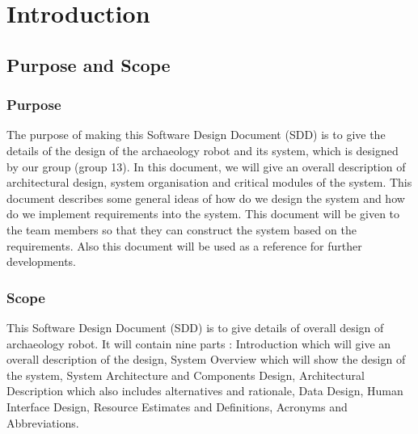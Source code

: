 \documentclass[11pt, a4paper]{report}
\begin{document}

\chapter{Introduction}%
\label{cha:I}


\section{Purpose and Scope}
\subsection{Purpose}
The purpose of making this Software Design Document (SDD) is to give the details of the design of the archaeology robot and its system, which is designed by our group (group 13). In this document, we will give an overall description of architectural design, system organisation and critical modules of the system. This document describes some general ideas of how do we design the system and how do we implement requirements into the system. This document will be given to the team members so that they can construct the system based on the requirements. Also this document will be used as a reference for further developments.


\subsection{Scope}
This Software Design Document (SDD) is to give details  of overall design of archaeology robot. It will contain nine parts : Introduction which will give an overall description of the design, System Overview which will show the design of the system, System Architecture and Components Design, Architectural Description which also includes alternatives and rationale, Data Design, Human Interface Design, Resource Estimates and Definitions, Acronyms and Abbreviations. 
\end{document}
